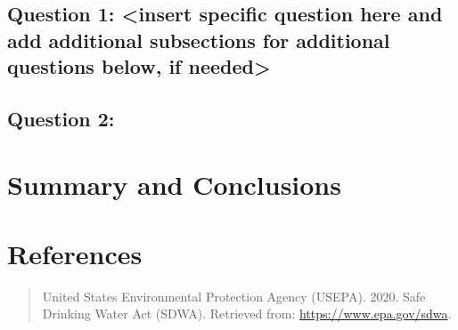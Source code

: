 \documentclass[12pt,]{article}
\begin{document}
\hypertarget{question-1-insert-specific-question-here-and-add-additional-subsections-for-additional-questions-below-if-needed}{%
\subsection{Question 1: \textless{}insert specific question here and add
additional subsections for additional questions below, if
needed\textgreater{}}\label{question-1-insert-specific-question-here-and-add-additional-subsections-for-additional-questions-below-if-needed}}

\hypertarget{question-2}{%
\subsection{Question 2:}\label{question-2}}

\newpage

\hypertarget{summary-and-conclusions}{%
\section{Summary and Conclusions}\label{summary-and-conclusions}}

\newpage

\hypertarget{references}{%
\section{References}\label{references}}

\begin{quote}
United States Environmental Protection Agency (USEPA). 2020. Safe
Drinking Water Act (SDWA). Retrieved from:
\url{https://www.epa.gov/sdwa}.
\end{quote}
\end{document}
